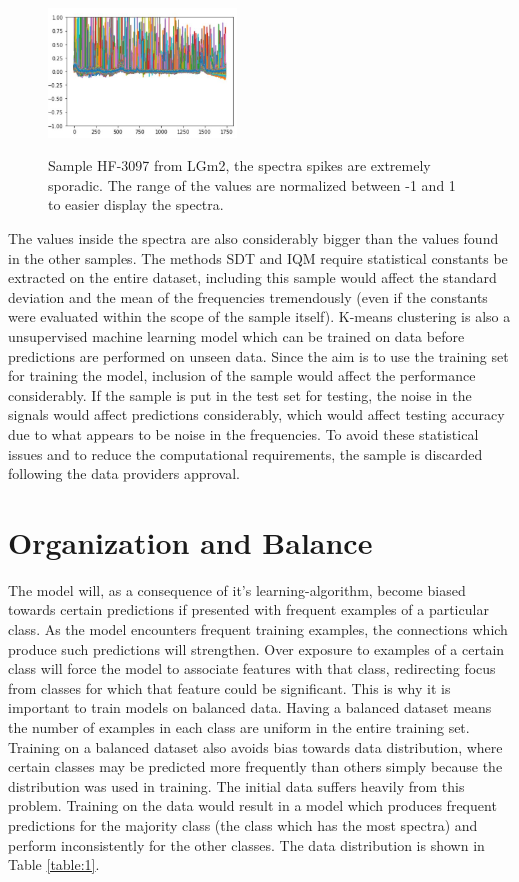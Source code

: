 \begin{figure}[H]

    \centering
{\includegraphics[width=5cm]{images/HF_3097.JPG} }
\caption{Sample HF-3097 from LGm2, the spectra spikes are extremely sporadic. The range of the values are normalized between -1 and 1 to easier display the spectra.\label{fig:HF3097}}%

\end{figure}

The values inside the spectra are also considerably bigger than the values found in the other samples. The methods SDT and IQM require statistical constants be extracted on the entire dataset, including this sample would affect the standard deviation and the mean of the frequencies tremendously (even if the constants were evaluated within the scope of the sample itself). K-means clustering is also a unsupervised machine learning model which can be trained on data before predictions are performed on unseen data. Since the aim is to use the training set  for training the model, inclusion of the sample would affect the performance considerably. If the sample is put in the test set for testing, the noise in the signals would affect predictions considerably, which would affect testing accuracy due to what appears to be noise in the frequencies. To avoid these statistical issues and to reduce the computational requirements, the sample is discarded following the data providers approval.

\section{Organization and Balance}
The model will, as a consequence of it's learning-algorithm, become biased towards certain predictions if presented with frequent examples of a particular class. As the model encounters frequent training examples, the connections which produce such predictions will strengthen. Over exposure to examples of a certain class will force the model to associate features with that class, redirecting focus from classes for which that feature could be significant. This is why it is important to train models on balanced data. Having a balanced dataset means the number of examples in each class are uniform in the entire training set. Training on a balanced dataset also avoids bias towards data distribution, where certain classes may be predicted more frequently than others simply because the distribution was used in training. The initial data suffers heavily from this problem. Training on the data would result in a model which produces frequent predictions for the majority class (the class which has the most spectra) and perform inconsistently for the other classes. The data distribution is shown in Table \ref{table:1}.

